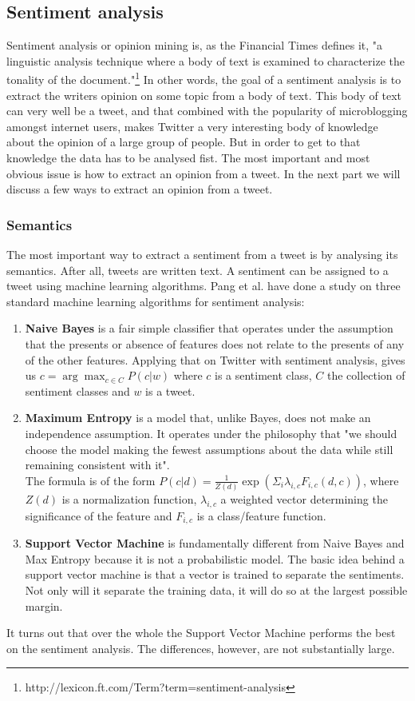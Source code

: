 \documentclass{article}
\begin{document}
\subsection{Sentiment analysis}
Sentiment analysis or opinion mining is, as the Financial Times defines it, "a linguistic analysis technique where a body of text is examined to characterize the tonality of the document."\footnote{http://lexicon.ft.com/Term?term=sentiment-analysis} In other words, the goal of a sentiment analysis is to extract the writers opinion on some topic from a body of text. This body of text can very well be a tweet, and that combined with the popularity of microblogging amongst internet users, makes Twitter a very interesting body of knowledge about the opinion of a large group of people. But in order to get to that knowledge the data has to be analysed fist. 
The most important and most obvious issue is how to extract an opinion from a tweet. In the next part we will discuss a few ways to extract an opinion from a tweet.
\subsubsection{Semantics }
The most important way to extract a sentiment from a tweet is by analysing its semantics. After all, tweets are written text. A sentiment can be assigned to a tweet using machine learning algorithms. Pang et al. \cite{machineLearning} have done a study on three standard machine learning algorithms for sentiment analysis: 
\begin{enumerate}
\item \textbf{Naive Bayes} is a fair simple classifier that operates under the assumption that the presents or absence of features does not relate to the presents of any of the other features. Applying that on Twitter with sentiment analysis, gives us $c = \arg\max_{c\in C} P(c|w)$ where $c$ is a sentiment class, $C$ the collection of sentiment classes and $w$ is a tweet. \cite{sentAnalysis}
\item \textbf{Maximum Entropy} is a model that, unlike Bayes, does not make an independence assumption. It operates under the philosophy that "we should choose the model making the fewest assumptions about the data while still remaining consistent with it".\cite{machineLearning} \\
The formula is of the form $P(c|d) = \frac{1}{Z(d)}\exp(\Sigma_i \lambda_{i,c}F_{i,c}(d,c))$, where $Z(d)$ is a normalization function, $\lambda_{i,c}$ a weighted vector determining the significance of the feature and $F_{i,c}$ is a class/feature function. 
\item \textbf{Support Vector Machine} is fundamentally different from Naive Bayes and Max Entropy because it is not a probabilistic model. The basic idea behind a support vector machine is that a vector is trained to separate the sentiments. Not only will it separate the training data, it will do so at the largest possible margin. 
\end{enumerate}
It turns out that over the whole the Support Vector Machine performs the best on the sentiment analysis\cite{machineLearning}. The differences, however, are not substantially large. 
\end{document}
